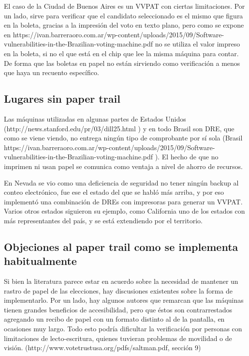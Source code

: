 El caso de la Ciudad de Buenos Aires es un VVPAT con ciertas limitaciones. Por un lado, sirve para verificar que el candidato seleccionado es el mismo que figura en la boleta, gracias a la impresión del voto en texto plano, pero como se expone en https://ivan.barreraoro.com.ar/wp-content/uploads/2015/09/Software-vulnerabilities-in-the-Brazilian-voting-machine.pdf no se utiliza el valor impreso en la boleta, si no el que está en el chip que lee la misma máquina para contar. De forma que las boletas en papel no están sirviendo como verificación a menos que haya un recuento específico.


\subsection{Lugares sin paper trail}

Las máquinas utilizadas en algunas partes de Estados Unidos (http://news.stanford.edu/pr/03/dill25.html ) y en todo Brasil son DRE, que como se viene viendo, no entrega ningún tipo de comprobante por sí sola (Brasil https://ivan.barreraoro.com.ar/wp-content/uploads/2015/09/Software-vulnerabilities-in-the-Brazilian-voting-machine.pdf ). El hecho de que no imprimen ni usan papel se comunica como ventaja a nivel de ahorro de recursos.

En Nevada se vio como una deficiencia de seguridad no tener ningún backup al conteo electrónico, fue ese el estado del que se habló más arriba, y por eso implementó una combinación de DREs con impresoras para generar un VVPAT. Varios otros estados siguieron su ejemplo, como California uno de los estados con más representantes del país, y se está extendiendo por el territorio.

\subsection{Objeciones al paper trail como se implementa habitualmente}

Si bien la literatura parece estar en acuerdo sobre la necesidad de mantener un rastro de papel de las elecciones, hay discusiones existentes sobre la forma de implementarlo. Por un lado, hay algunos autores que remarcan que las máquinas tienen grandes beneficios de accesibilidad, pero que éstos son contrarrestados agregando un recibo de papel con un formato distinto al de la pantalla, en ocasiones muy largo. Todo esto podría dificultar la verificación por personas con limitaciones de lecto-escritura, quienes tuvieran problemas de movilidad o de visión. (http://www.votetrustusa.org/pdfs/saltman.pdf, sección 9)

